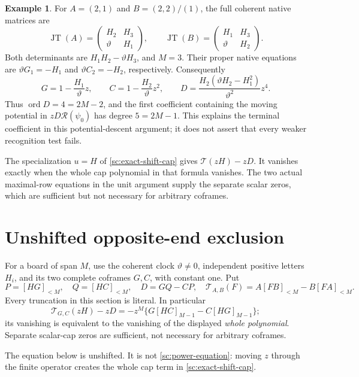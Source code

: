 \documentclass[11pt,a4paper]{amsart}
\numberwithin{equation}{section}
\theoremstyle{plain}
\theoremstyle{definition}
\newtheorem{example}[theorem]{Example}
\newcommand{\JT}{\operatorname{JT}}
\newcommand{\ord}{\operatorname{ord}}
\begin{document}
\begin{example}\label{ex:terminal-coframes}
For \(A=(2,1)\) and \(B=(2,2)/(1)\), the full coherent native
matrices are
\[
 \JT(A)=\begin{pmatrix}H_2&H_3\\ \vartheta&H_1\end{pmatrix},
 \qquad
 \JT(B)=\begin{pmatrix}H_1&H_3\\ \vartheta&H_2\end{pmatrix}.
\]
Both determinants are \(H_1H_2-\vartheta H_3\), and \(M=3\).
Their proper native equations are
\(\vartheta G_1=-H_1\) and \(\vartheta C_2=-H_2\), respectively.
Consequently
\[
 G=1-\frac{H_1}{\vartheta}z,\qquad
 C=1-\frac{H_2}{\vartheta}z^2,\qquad
 D=\frac{H_2(\vartheta H_2-H_1^2)}{\vartheta^2}z^4.
\]
Thus \(\ord D=4=2M-2\), and the first coefficient containing
the moving potential in \(zD\mathcal R(\psi_0)\) has degree
\(5=2M-1\).  This explains the terminal coefficient in this
potential-descent argument; it does not assert that every weaker
recognition test fails.
\end{example}


The specialization \(u=H\) of \eqref{sc:exact-shift-cap} gives
\(\mathcal T(zH)-zD\).  It vanishes exactly when the whole cap
polynomial in that formula vanishes.  The two actual maximal-row equations
in the unit argument supply the separate scalar zeros, which are
sufficient but not necessary for arbitrary coframes.

\section{Unshifted opposite-end exclusion}\label{sec:unshifted}

For a board of span \(M\), use the coherent clock \(\vartheta\ne0\),
independent positive letters \(H_i\), and its two complete coframes
\(G,C\), with constant one.  Put
\[
 P=[HG]_{<M},\quad Q=[HC]_{<M},\quad D=GQ-CP,
 \quad
 \mathcal{T}_{A,B}(F)=A[FB]_{<M}-B[FA]_{<M}.
\]
Every truncation in this section is literal.  In particular
\[
 \mathcal{T}_{G,C}(zH)-zD
   =-z^M\{G[HC]_{M-1}-C[HG]_{M-1}\};
\]
its vanishing is equivalent to the vanishing of the displayed
\emph{whole polynomial}.  Separate scalar-cap zeros are sufficient,
not necessary for arbitrary coframes.

The equation below is unshifted.  It is not
\eqref{sc:power-equation}: moving \(z\) through the finite operator
creates the whole cap term in \eqref{sc:exact-shift-cap}.
\end{document}
